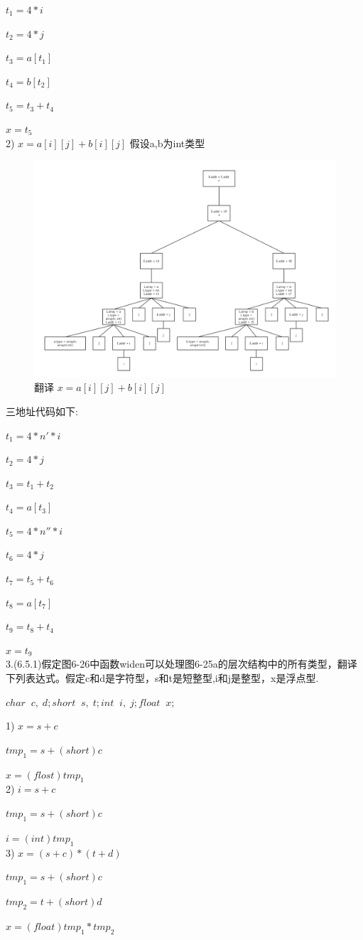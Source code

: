 \documentclass[a4paper, 16pt]{article}
\begin{document}
$t_1 = 4* i$

$t_2 = 4*j$

$t_3 = a[t_1]$

$t_4 = b[ t_2]$

$t_5 = t_3 + t_4$

$x = t_5$\\


2) $x = a[i][j] + b[i][j]$
假设a,b为int类型
\begin{figure}[H]
\centering
\includegraphics[scale=0.3]{chapter6_hw2_2}
\caption{翻译 $x = a[i][j] + b[i][j]$}
\end{figure}

三地址代码如下:

$t_1 = 4*n'* i$

$t_2 = 4*j$

$t_3 = t_1 + t_2$

$t_4 = a[t_3]$

$t_5 = 4*n''* i$

$t_6 = 4*j$

$t_7 = t_5 + t_6$

$t_8 = a[t_7]$

$t_9 = t_8 + t_4$

$x = t_9$\\

3.(6.5.1)假定图6-26中函数widen可以处理图6-25a的层次结构中的所有类型，翻译下列表达式。假定c和d是字符型，s和t是短整型,i和j是整型，x是浮点型.

$char \;\; c,\; d; short\;\; s,\;t; int \; \; i,\;j; float \; \;x;$

1) $x = s + c$

$tmp_1 = s + (short)c$

$x = (flost) tmp_1$\\

2) $i = s + c$

$tmp_1 = s + (short)c$

$i = (int) tmp_1$\\

3) $x = (s+c) * (t+d)$

$tmp_1 = s + (short)c$

$tmp_2 = t + (short)d$

$x = (float) tmp_1 * tmp_2$
\end{document}
